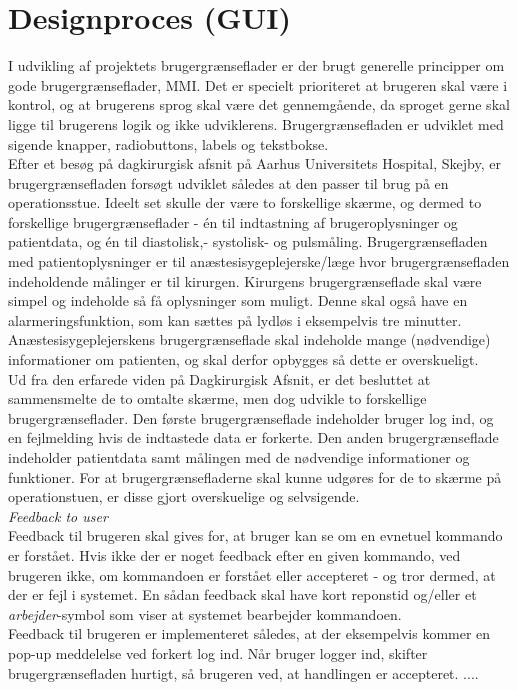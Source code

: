 \section{Designproces (GUI)}
I udvikling af projektets brugergrænseflader er der brugt generelle principper om gode brugergrænseflader, MMI. Det er specielt prioriteret at brugeren skal være i kontrol, og at brugerens sprog skal være det gennemgående, da sproget gerne skal ligge til brugerens logik og ikke udviklerens. Brugergrænsefladen er udviklet med sigende knapper, radiobuttons, labels og tekstbokse. \\
\newline
Efter et besøg på dagkirurgisk afsnit på Aarhus Universitets Hospital, Skejby, er brugergrænsefladen forsøgt udviklet således at den passer til brug på en operationsstue. Ideelt set skulle der være to forskellige skærme, og dermed to forskellige brugergrænseflader - én til indtastning af brugeroplysninger og patientdata, og én til diastolisk,- systolisk- og pulsmåling. Brugergrænsefladen med patientoplysninger er til anæstesisygeplejerske/læge hvor brugergrænsefladen indeholdende målinger er til kirurgen. Kirurgens brugergrænseflade skal være simpel og indeholde så få oplysninger som muligt. Denne skal også have en alarmeringsfunktion, som kan sættes på lydløs i eksempelvis tre minutter. Anæstesisygeplejerskens brugergrænseflade skal indeholde mange (nødvendige) informationer om patienten, og skal derfor opbygges så dette er overskueligt.\\
Ud fra den erfarede viden på Dagkirurgisk Afsnit, er det besluttet at sammensmelte de to omtalte skærme, men dog udvikle to forskellige brugergrænseflader. Den første brugergrænseflade indeholder bruger log ind, og en fejlmelding hvis de indtastede data er forkerte. Den anden brugergrænseflade indeholder patientdata samt målingen med de nødvendige informationer og funktioner. For at brugergrænsefladerne skal kunne udgøres for de to skærme på operationstuen, er disse gjort overskuelige og selvsigende. \\
\newline
\textit{Feedback to user}\\
Feedback til brugeren skal gives for, at bruger kan se om en evnetuel kommando er forstået. Hvis ikke der er noget feedback efter en given kommando, ved brugeren ikke, om kommandoen er forstået eller accepteret - og tror dermed, at der er fejl i systemet. En sådan feedback skal have kort reponstid og/eller et \textit{arbejder}-symbol som viser at systemet bearbejder kommandoen.\\
Feedback til brugeren er implementeret således, at der eksempelvis kommer en pop-up meddelelse ved forkert log ind. Når bruger logger ind, skifter brugergrænsefladen hurtigt, så brugeren ved, at handlingen er accepteret.  ....  


